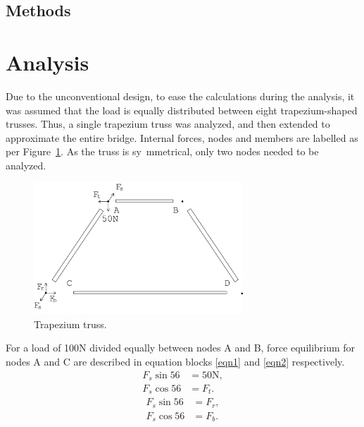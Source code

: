 \documentclass[12pt]{article}
\begin{document}
		\subsection{Methods}
	\section{Analysis}
		Due to the unconventional design, to ease the calculations during the analysis, it was assumed that the load is equally distributed between eight trapezium-shaped trusses. Thus, a single trapezium truss was analyzed, and then extended to approximate the entire bridge. Internal forces, nodes and members are labelled as per Figure~\ref{trap}. As the truss is sy~mmetrical, only two nodes needed to be analyzed.
		\begin{figure}[h!]
			\centering
			\includegraphics[width=0.7\textwidth]{trapanal}
			\caption{Trapezium truss.}
			\label{trap}
		\end{figure}
		For a load of 100N divided equally between nodes A and B, force equilibrium for nodes A and C are described in equation blocks \ref{eqn1} and \ref{eqn2} respectively.
		\begin{subequations}
			\begin{align}
				F_s \sin 56&=50\mathrm{N}, \\
				F_s \cos 56&=F_t.
			\end{align} \label{eqn1}
		\end{subequations}
		\begin{subequations}
			\begin{align}
				F_s \sin 56&=F_r, \\ 
				F_s \cos 56&=F_b.
			\end{align} \label{eqn2}
		\end{subequations}
\end{document}
